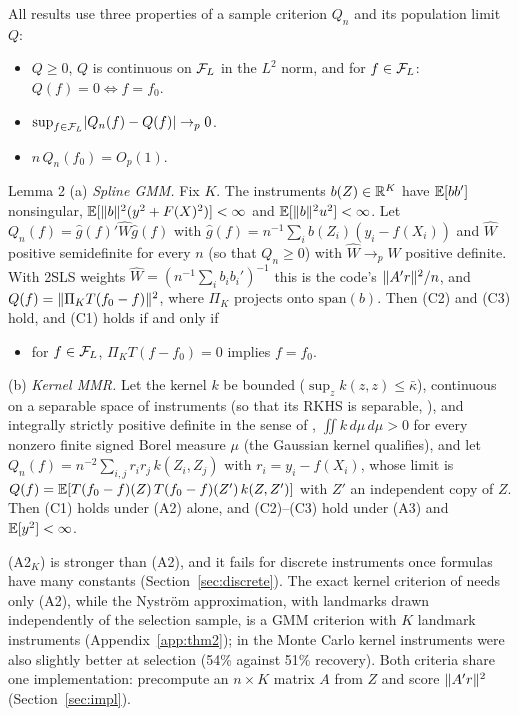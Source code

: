 All results use three properties of a sample criterion $Q_n$ and its population limit $Q$:
\begin{itemize}
\item[(C1)] $Q \ge 0$, $Q$ is continuous on $\mathcal{F}_L$ in the $L^2$ norm, and for $f \in \mathcal{F}_L$: $Q(f) = 0 \iff f = f_0$.
\item[(C2)] $\sup_{f \in \mathcal{F}_L}\lvert Q_n(f) - Q(f)\rvert \to_p 0$.
\item[(C3)] $n\,Q_n(f_0) = O_p(1)$.
\end{itemize}

\begin{result}[Lemma2]{Lemma 2}
(a) \emph{Spline GMM.} Fix $K$. The instruments $b(Z) \in \mathbb{R}^K$ have $\mathbb{E}[bb']$ nonsingular, $\mathbb{E}[\lVert b\rVert^2(y^2 + F(X)^2)] < \infty$ and $\mathbb{E}[\lVert b\rVert^2u^2] < \infty$. Let $Q_n(f) = \hat g(f)'\hat W\hat g(f)$ with $\hat g(f) = n^{-1}\sum_i b(Z_i)(y_i - f(X_i))$ and $\hat W$ positive semidefinite for every $n$ (so that $Q_n \ge 0$) with $\hat W \to_p W$ positive definite. With 2SLS weights $\hat W = (n^{-1}\sum_i b_ib_i')^{-1}$ this is the code's $\lVert A'r\rVert^2/n$, and $Q(f) = \lVert \Pi_KT(f_0 - f)\rVert^2$, where $\Pi_K$ projects onto $\mathrm{span}(b)$. Then (C2) and (C3) hold, and (C1) holds if and only if
\begin{itemize}
\item[(A2$_K$)] for $f \in \mathcal{F}_L$, $\Pi_KT(f - f_0) = 0$ implies $f = f_0$.
\end{itemize}
(b) \emph{Kernel MMR.} Let the kernel $k$ be bounded ($\sup_zk(z,z) \le \bar\kappa$), continuous on a separable space of instruments (so that its RKHS is separable, \citealp[Lemma 4.33]{steinwartchristmann2008}), and integrally strictly positive definite in the sense of \citet{sriperumbudur2011}, $\iint k\,d\mu\,d\mu > 0$ for every nonzero finite signed Borel measure $\mu$ (the Gaussian kernel qualifies), and let $Q_n(f) = n^{-2}\sum_{i,j}r_ir_j\,k(Z_i, Z_j)$ with $r_i = y_i - f(X_i)$, whose limit is $Q(f) = \mathbb{E}[T(f_0 - f)(Z)\,T(f_0 - f)(Z')\,k(Z, Z')]$ with $Z'$ an independent copy of $Z$. Then (C1) holds under (A2) alone, and (C2)--(C3) hold under (A3) and $\mathbb{E}[y^2] < \infty$.
\end{result}

(A2$_K$) is stronger than (A2), and it fails for discrete instruments once formulas have many constants (Section~\ref{sec:discrete}). The exact kernel criterion of \citet{zhang2020} needs only (A2), while the Nystr\"om approximation, with landmarks drawn independently of the selection sample, is a GMM criterion with $K$ landmark instruments (Appendix~\ref{app:thm2}); in the Monte Carlo kernel instruments were also slightly better at selection (54\% against 51\% recovery). Both criteria share one implementation: precompute an $n \times K$ matrix $A$ from $Z$ and score $\lVert A'r\rVert^2$ (Section~\ref{sec:impl}).

